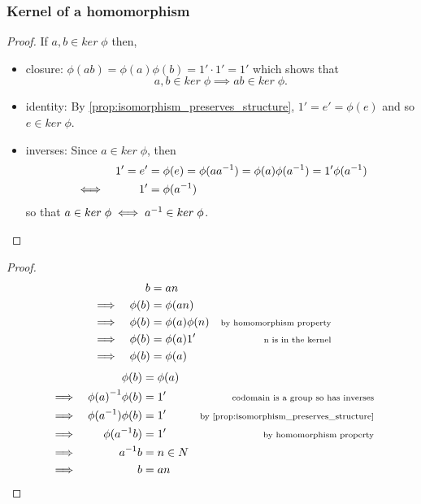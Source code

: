 \documentclass[MathsNotesBase.tex]{subfiles}
\begin{document}
{	\subsubsection{Kernel of a homomorphism}

	\begin{proof}
		If $a,b \in ker \; \phi$ then,
		\begin{itemize}
			\item{closure: $ \phi(ab) = \phi(a)\phi(b) = 1' \cdot 1' = 1' $ which shows that 
				\[ a,b \in ker \; \phi \implies ab \in ker \; \phi. \] }
			\item{identity: By \autoref{prop:isomorphism_preserves_structure}, $ 1' = e' = \phi(e) $ and so $e \in ker \; \phi $.}
			\item{inverses: Since $ a \in ker \; \phi $, then 
				\begin{align*}
				&&1' = e' &= \phi(e) = \phi(a{a}^{-1}) = \phi(a)\phi({a}^{-1}) = 1'\phi({a}^{-1}) \\
				&\iff &1' &= \phi({a}^{-1})
				\end{align*}
				so that $ a \in ker \; \phi \iff {a}^{-1} \in ker \; \phi $.}
		\end{itemize}
	\end{proof}

	\begin{proof}
		\begin{align*}
		&& b &= an  \\
		&\implies & \phi(b) &= \phi(an) \\
		&\implies & \phi(b) &= \phi(a)\phi(n) &\text{\scriptsize{by homomorphism property}} \\
		&\implies & \phi(b) &= \phi(a)1' &\text{\scriptsize{n is in the kernel}} \\
		&\implies & \phi(b) &= \phi(a) \\
		\end{align*}
		\begin{align*}
		&& \phi(b) &= \phi(a) \\
		&\implies & \inv{\phi(a)}\phi(b) &= 1'  &\sidecomment{codomain is a group so has inverses} \\
		&\implies & \phi(\inv{a})\phi(b) &= 1' &\sidecomment{by \autoref{prop:isomorphism_preserves_structure}} \\
		&\implies & \phi(\inv{a}b) &= 1' &\sidecomment{by homomorphism property} \\
		&\implies & \inv{a}b &= n \in N \\
		&\implies & b &= an \\
		\end{align*}
	\end{proof}
	
}
\end{document}

